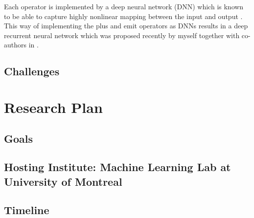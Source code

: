\documentclass[11pt, oneside]{essay}
\begin{document}
Each operator is implemented by a deep neural network (DNN) which is
known to be able to capture highly nonlinear mapping between the
input and output \citep{Rumelhart1986}. This way of implementing
the plus and emit operators as DNNs results in a deep recurrent
neural network which was proposed recently by myself together
with co-authors in \citep{Pascanu2013}.


\subsection{Challenges}










\section{Research Plan}

\subsection{Goals}

\subsection{Hosting Institute: Machine Learning Lab at University of Montreal}

\subsection{Timeline}







\small


\end{document}
